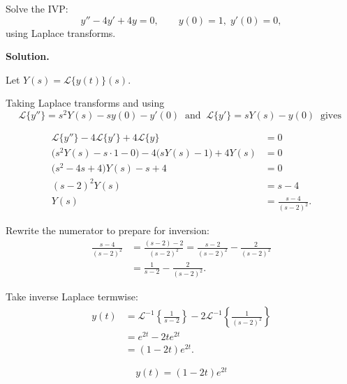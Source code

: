     \begin{example}
      Solve the IVP:
      \[
      y'' - 4y' + 4y = 0,\qquad y(0)=1,\; y'(0)=0,
      \]
      using Laplace transforms.

      \textbf{Solution.}
      
      Let $Y(s)=\mathcal{L}\{y(t)\}(s)$.

      Taking Laplace transforms and using
      $$\mathcal{L}\{y''\}=s^2Y(s)-sy(0)-y'(0) \:\text{ and }\: \mathcal{L}\{y'\}=sY(s)-y(0) \:\text{ gives }$$

      \begin{align*}
      \mathcal{L}\{y''\} - 4\mathcal{L}\{y'\} + 4\mathcal{L}\{y\} &= 0\\
      \big(s^2Y(s)-s\cdot 1 - 0\big) - 4\big(sY(s)-1\big) + 4Y(s) &= 0\\
      \big(s^2 - 4s + 4\big)Y(s) - s + 4 &= 0\\
      (s-2)^2 Y(s) &= s - 4\\
      Y(s) &= \frac{s-4}{(s-2)^2}.
      \end{align*}

      Rewrite the numerator to prepare for inversion:
      \begin{align*}
      \frac{s-4}{(s-2)^2} &= \frac{(s-2)-2}{(s-2)^2}
      = \frac{s-2}{(s-2)^2} - \frac{2}{(s-2)^2} \\
      &= \frac{1}{s-2} - \frac{2}{(s-2)^2}.
      \end{align*}

      Take inverse Laplace termwise:
      \begin{align*}
      y(t) &= \mathcal{L}^{-1}\!\left\{\frac{1}{s-2}\right\}
            - 2\mathcal{L}^{-1}\!\left\{\frac{1}{(s-2)^2}\right\}\\
          &= e^{2t} - 2t e^{2t}\\
          &= (1-2t)e^{2t}.
      \end{align*}

      \[
      \boxed{\,y(t)=(1-2t)e^{2t}\,}
      \]
    \end{example}


    \begin{marginfigure}
        
    \end{marginfigure}


